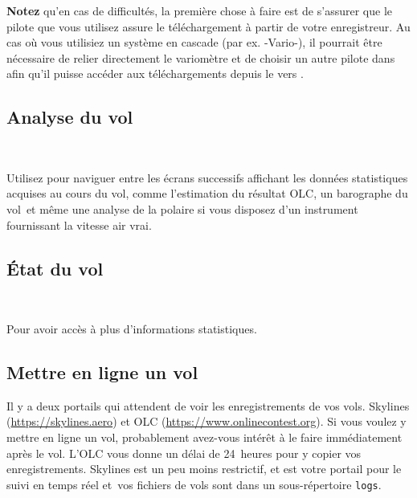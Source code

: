 \documentclass[french, a4paper, 12pt]{refrep}
\newcommand{\info}[3]{\bmenut{Info}{#1/3}{\LARGE$\triangleright$}~\bmenut{#2}{#3}}%
\begin{document}

\textbf{Notez} qu'en cas de difficultés, la première chose à faire est de s'assurer que le pilote
que vous utilisez assure le téléchargement à partir de votre enregistreur. Au cas où vous utilisiez un système
en cascade (par ex. \fl-Vario-\xc), il pourrait être nécessaire de relier directement
le variomètre et de choisir un autre pilote dans \xc{} afin qu'il puisse accéder aux
téléchargements depuis le \fl{} vers \xc.

\subsection{\textcolor{flashblue}{Analyse du vol}}
\begin{flushleft}\hspace*{1cm}\info{1}{Analyse}{}\\\end{flushleft}
Utilisez \bmenuw{\blink} pour naviguer entre les écrans successifs affichant les données statistiques
acquises au cours du vol, comme l'estimation du résultat OLC, un barographe du vol\textellipsis\
 et même une analyse de la polaire si vous disposez d'un instrument
fournissant la vitesse air vrai.

\subsection{\textcolor{flashblue}{État du vol}}
\begin{flushleft}\hspace*{1cm}\info{2}{État}{}\blink{}\\\end{flushleft}
Pour avoir accès à plus d'informations statistiques.

\subsection{\textcolor{flashblue}{Mettre en ligne un vol}}

Il y a deux portails qui attendent de voir les enregistrements de vos vols.
Skylines (\url{https://skylines.aero})
et OLC (\url{https://www.onlinecontest.org}).
Si vous voulez y mettre en ligne un vol, probablement avez-vous intérêt à le faire immédiatement après le vol. L'OLC vous donne un délai de 24~heures pour y copier vos enregistrements.
Skylines est un peu moins restrictif, et est votre portail pour le suivi en temps réel et\textellipsis\
vos fichiers de vols sont dans un sous-répertoire \texttt{logs}.
\end{document}
